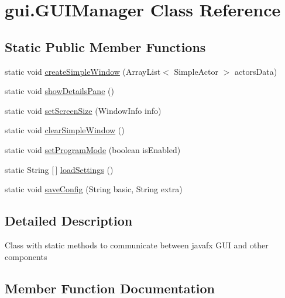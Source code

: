 \hypertarget{classgui_1_1_g_u_i_manager}{}\section{gui.\+G\+U\+I\+Manager Class Reference}
\label{classgui_1_1_g_u_i_manager}
\subsection*{Static Public Member Functions}
\begin{DoxyCompactItemize}
\item 
static void \hyperlink{classgui_1_1_g_u_i_manager_ad0f98411aba9a8fe15a3965bee9a004d}{create\+Simple\+Window} (Array\+List$<$ Simple\+Actor $>$ actors\+Data)
\item 
static void \hyperlink{classgui_1_1_g_u_i_manager_a53027e64ff28a5c403ca6c5701760e41}{show\+Details\+Pane} ()
\item 
static void \hyperlink{classgui_1_1_g_u_i_manager_a535ab6d04abe06fab3dd346a66680f02}{set\+Screen\+Size} (Window\+Info info)
\item 
static void \hyperlink{classgui_1_1_g_u_i_manager_a92b21d9ad29b097a5e679da1de80a6e1}{clear\+Simple\+Window} ()
\item 
static void \hyperlink{classgui_1_1_g_u_i_manager_a2fda83994d697d912245b9be520a57a1}{set\+Program\+Mode} (boolean is\+Enabled)
\item 
static String \mbox{[}$\,$\mbox{]} \hyperlink{classgui_1_1_g_u_i_manager_a4befd69398d555a850a3e14afcb29ebe}{load\+Settings} ()
\item 
static void \hyperlink{classgui_1_1_g_u_i_manager_a7b6597e10beb5cade7d7333e781ddaed}{save\+Config} (String basic, String extra)
\end{DoxyCompactItemize}


\subsection{Detailed Description}
Class with static methods to communicate between javafx G\+UI and other components 

\subsection{Member Function Documentation}
\mbox{\label{classgui_1_1_g_u_i_manager_a92b21d9ad29b097a5e679da1de80a6e1}} 
